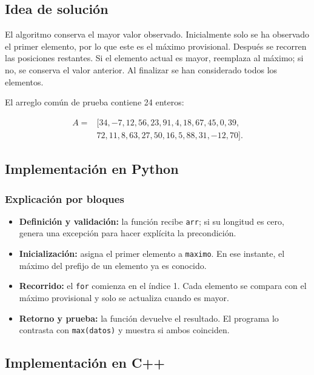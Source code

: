\documentclass[12pt,letterpaper]{article}
\newcommand{\codigo}[1]{\texttt{#1}}
\begin{document}
\subsection{Idea de solución}

El algoritmo conserva el mayor valor observado. Inicialmente solo se ha observado el primer elemento, por lo que este es el máximo provisional. Después se recorren las posiciones restantes. Si el elemento actual es mayor, reemplaza al máximo; si no, se conserva el valor anterior. Al finalizar se han considerado todos los elementos.

El arreglo común de prueba contiene 24 enteros:

\[
\begin{split}
A={}&[34,-7,12,56,23,91,4,18,67,45,0,39,\\
&72,11,8,63,27,50,16,5,88,31,-12,70].
\end{split}
\]

\subsection{Implementación en Python}



\subsubsection{Explicación por bloques}

\begin{itemize}
  \item \textbf{Definición y validación:} la función recibe \codigo{arr}; si su longitud es cero, genera una excepción para hacer explícita la precondición.
  \item \textbf{Inicialización:} asigna el primer elemento a \codigo{maximo}. En ese instante, el máximo del prefijo de un elemento ya es conocido.
  \item \textbf{Recorrido:} el \codigo{for} comienza en el índice 1. Cada elemento se compara con el máximo provisional y solo se actualiza cuando es mayor.
  \item \textbf{Retorno y prueba:} la función devuelve el resultado. El programa lo contrasta con \codigo{max(datos)} y muestra si ambos coinciden.
\end{itemize}

\subsection{Implementación en C++}
\end{document}
